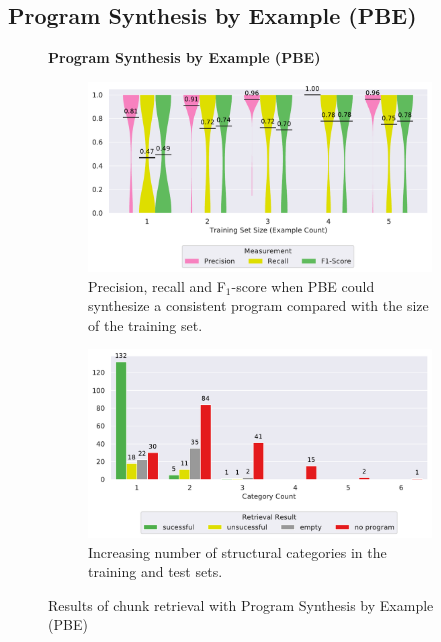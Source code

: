 \subsection{Program Synthesis by Example (PBE)}
\label{sec:r:pbe}
\begin{figure}
\centering
    \textbf{Program Synthesis by Example (PBE)}\par\medskip
\begin{subfigure}[b]{\columnwidth}
		\centering
		\includegraphics[width=\columnwidth, clip]{img/big-study/recall-precision-examplecount-sythesisworked-PBE.pdf}
                		\caption{Precision, recall and F$_{1}$-score when PBE could synthesize a consistent program compared with the size of the training set.}
                \label{fig:recall-precision-examplecount-sythesisworked-PBE}
\end{subfigure}\hspace{\fill}
\begin{subfigure}[b]{\columnwidth}
		\centering
		\includegraphics[width=\columnwidth, clip]{img/big-study/failure-reason-categorycount-PBE.pdf}
                		\caption{Increasing number of structural categories in the training and test sets.}
                \label{fig:failure-reason-categorycount-PBE}
\end{subfigure}
\caption{Results of chunk retrieval with  Program Synthesis by Example (PBE)}
\end{figure}


